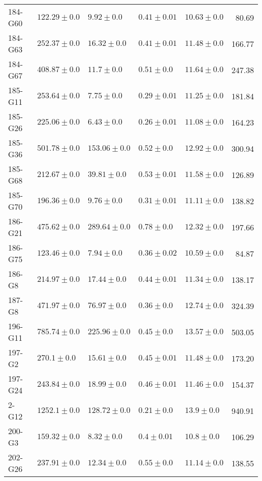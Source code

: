 \begin{tabular}{lllllr}
    184-G60 &     $122.29 \pm 0.0$ &        $9.92 \pm 0.0$ &  $0.41 \pm 0.01$ &  $10.63 \pm 0.0$ &     80.69 \\
    184-G63 &     $252.37 \pm 0.0$ &       $16.32 \pm 0.0$ &  $0.41 \pm 0.01$ &  $11.48 \pm 0.0$ &    166.77 \\
    184-G67 &     $408.87 \pm 0.0$ &        $11.7 \pm 0.0$ &   $0.51 \pm 0.0$ &  $11.64 \pm 0.0$ &    247.38 \\
    185-G11 &     $253.64 \pm 0.0$ &        $7.75 \pm 0.0$ &  $0.29 \pm 0.01$ &  $11.25 \pm 0.0$ &    181.84 \\
    185-G26 &     $225.06 \pm 0.0$ &        $6.43 \pm 0.0$ &  $0.26 \pm 0.01$ &  $11.08 \pm 0.0$ &    164.23 \\
    185-G36 &     $501.78 \pm 0.0$ &      $153.06 \pm 0.0$ &   $0.52 \pm 0.0$ &  $12.92 \pm 0.0$ &    300.94 \\
    185-G68 &     $212.67 \pm 0.0$ &       $39.81 \pm 0.0$ &  $0.53 \pm 0.01$ &  $11.58 \pm 0.0$ &    126.89 \\
    185-G70 &     $196.36 \pm 0.0$ &        $9.76 \pm 0.0$ &  $0.31 \pm 0.01$ &  $11.11 \pm 0.0$ &    138.82 \\
    186-G21 &     $475.62 \pm 0.0$ &      $289.64 \pm 0.0$ &   $0.78 \pm 0.0$ &  $12.32 \pm 0.0$ &    197.66 \\
    186-G75 &     $123.46 \pm 0.0$ &        $7.94 \pm 0.0$ &  $0.36 \pm 0.02$ &  $10.59 \pm 0.0$ &     84.87 \\
     186-G8 &     $214.97 \pm 0.0$ &       $17.44 \pm 0.0$ &  $0.44 \pm 0.01$ &  $11.34 \pm 0.0$ &    138.17 \\
     187-G8 &     $471.97 \pm 0.0$ &       $76.97 \pm 0.0$ &   $0.36 \pm 0.0$ &  $12.74 \pm 0.0$ &    324.39 \\
    196-G11 &     $785.74 \pm 0.0$ &      $225.96 \pm 0.0$ &   $0.45 \pm 0.0$ &  $13.57 \pm 0.0$ &    503.05 \\
     197-G2 &      $270.1 \pm 0.0$ &       $15.61 \pm 0.0$ &  $0.45 \pm 0.01$ &  $11.48 \pm 0.0$ &    173.20 \\
    197-G24 &     $243.84 \pm 0.0$ &       $18.99 \pm 0.0$ &  $0.46 \pm 0.01$ &  $11.46 \pm 0.0$ &    154.37 \\
      2-G12 &     $1252.1 \pm 0.0$ &      $128.72 \pm 0.0$ &   $0.21 \pm 0.0$ &   $13.9 \pm 0.0$ &    940.91 \\
     200-G3 &     $159.32 \pm 0.0$ &        $8.32 \pm 0.0$ &   $0.4 \pm 0.01$ &   $10.8 \pm 0.0$ &    106.29 \\
    202-G26 &     $237.91 \pm 0.0$ &       $12.34 \pm 0.0$ &   $0.55 \pm 0.0$ &  $11.14 \pm 0.0$ &    138.55 \\

\end{tabular}
